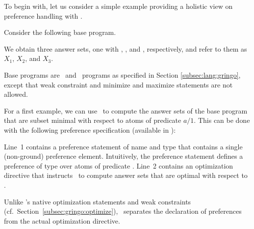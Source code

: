 To begin with,
let us consider a simple example providing a holistic view on preference handling with \asprin.
%
\begin{example}\label{asprin:example1}
Consider the following base program.
%

%
We obtain three answer sets, one with , , and , respectively,
and refer to them as $X_1$, $X_2$, and $X_3$.

\begin{note}
Base programs are \gringo\ and \clingo\ programs as specified in Section \ref{subsec:lang:gringo}, 
except that %
weak constraint and minimize and maximize statements are not allowed.
\end{note}

For a first example,
we can use \asprin\ to compute the answer sets of the base program that are subset minimal with respect to atoms of predicate $a/1$. 
This can be done with the following preference specification 
(available in ): 
%

%
Line~1 contains a preference statement of name  and type  that contains a single (non-ground) preference element.
Intuitively, the preference statement  defines a preference of type  over atoms of predicate . 
Line~2 contains an optimization directive that instructs \asprin\ to compute answer sets that are optimal with respect to . 

\begin{note}\label{asprin:note}
Unlike \gringo's native optimization statements and weak constraints (cf.\ Section~\ref{subsec:gringo:optimize}),
\asprin\ separates the declaration of preferences from the actual optimization directive.
\end{note}


\end{example}
